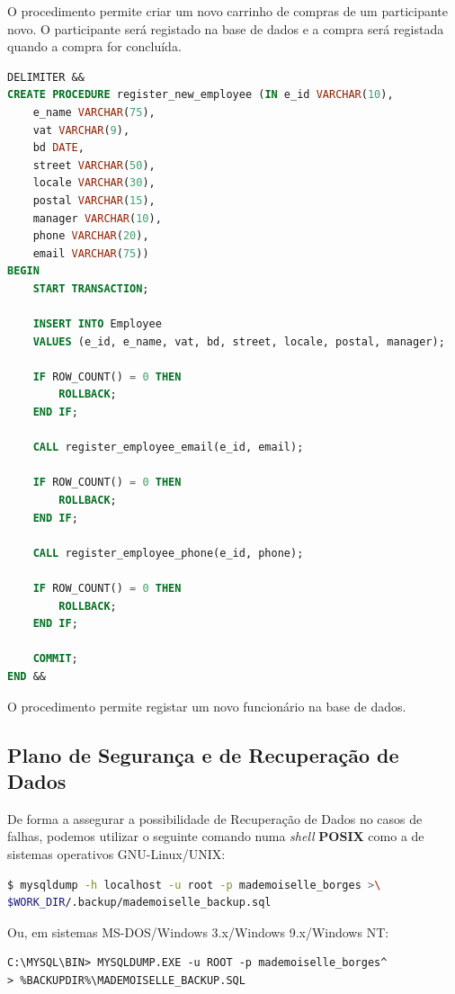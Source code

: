 \documentclass[a4paper,12pt]{scrreprt}
\begin{document}
O procedimento permite criar um novo carrinho de compras de um participante novo.
O participante será registado na base de dados e a compra será registada quando
a compra for concluída.


\newpage
\begin{lstlisting}[language=sql]
DELIMITER &&
CREATE PROCEDURE register_new_employee (IN e_id VARCHAR(10), 
    e_name VARCHAR(75),
    vat VARCHAR(9), 
    bd DATE, 
    street VARCHAR(50), 
    locale VARCHAR(30),
	postal VARCHAR(15), 
    manager VARCHAR(10),
    phone VARCHAR(20), 
    email VARCHAR(75))
BEGIN
    START TRANSACTION;

    INSERT INTO Employee
    VALUES (e_id, e_name, vat, bd, street, locale, postal, manager);

    IF ROW_COUNT() = 0 THEN
		ROLLBACK;
    END IF;

    CALL register_employee_email(e_id, email);

    IF ROW_COUNT() = 0 THEN
		ROLLBACK;
    END IF;

    CALL register_employee_phone(e_id, phone);

    IF ROW_COUNT() = 0 THEN
		ROLLBACK;
    END IF;

    COMMIT;
END &&
\end{lstlisting}

O procedimento permite registar um novo funcionário na base de dados.
\vspace{3cm}

\subsection{Plano de Segurança e de Recuperação de Dados}
De forma a assegurar a possibilidade de Recuperação de Dados no casos de falhas, podemos utilizar o seguinte
comando numa \textit{shell} \textbf{POSIX} como a de sistemas operativos GNU-Linux/UNIX:
\begin{lstlisting}[language=bash]
$ mysqldump -h localhost -u root -p mademoiselle_borges >\ 
$WORK_DIR/.backup/mademoiselle_backup.sql
\end{lstlisting}
Ou, em sistemas MS-DOS/Windows 3.x/Windows 9.x/Windows NT:
\begin{lstlisting}
C:\MYSQL\BIN> MYSQLDUMP.EXE -u ROOT -p mademoiselle_borges^
> %BACKUPDIR%\MADEMOISELLE_BACKUP.SQL 
\end{lstlisting}

\end{document}
